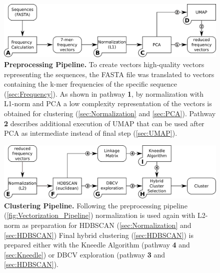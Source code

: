 \begin{figure}[!hbt]
    \centering
    \includegraphics[width=\textwidth]{Graphics/Vectorization.pdf}
    \caption[Preprocessing Pipeline]{\textbf{Preprocessing Pipeline.} To create vectors high-quality vectors representing the sequences, the FASTA file was translated to vectors containing the k-mer frequencies of the specific sequence (\autoref{sec:Frequency}). As shown in pathway \textsf{\textbf{1}}, by normalization with L1-norm and \gls{PCA} a low complexity representation of the vectors is obtained for clustering (\autoref{sec:Normalization} and \autoref{sec:PCA}). Pathway \textsf{\textbf{2}} describes additional execution of \gls{UMAP} that can be used after \gls{PCA} as intermediate instead of final step (\autoref{sec:UMAP}).}
    \label{fig:Vectorization_Pipeline}
\end{figure}

\begin{figure}[!hbt]
    \centering
    \includegraphics[width=\textwidth]{Graphics/Clustering.pdf}
    \caption[Clustering Pipeline]{\textbf{Clustering Pipeline.} Following the preprocessing pipeline (\autoref{fig:Vectorization_Pipeline}) normalization is used again with L2-norm as preparation for \gls{HDBSCAN} (\autoref{sec:Normalization} and \autoref{sec:HDBSCAN}) Final hybrid clustering (\autoref{sec:HDBSCAN}) is prepared either with the Kneedle Algorithm (pathway \textsf{\textbf{4}} and \autoref{sec:Kneedle}) or DBCV exploration (pathway \textsf{\textbf{3}} and \autoref{sec:HDBSCAN}).}
    \label{fig:Clustering_Pipeline}
\end{figure}

